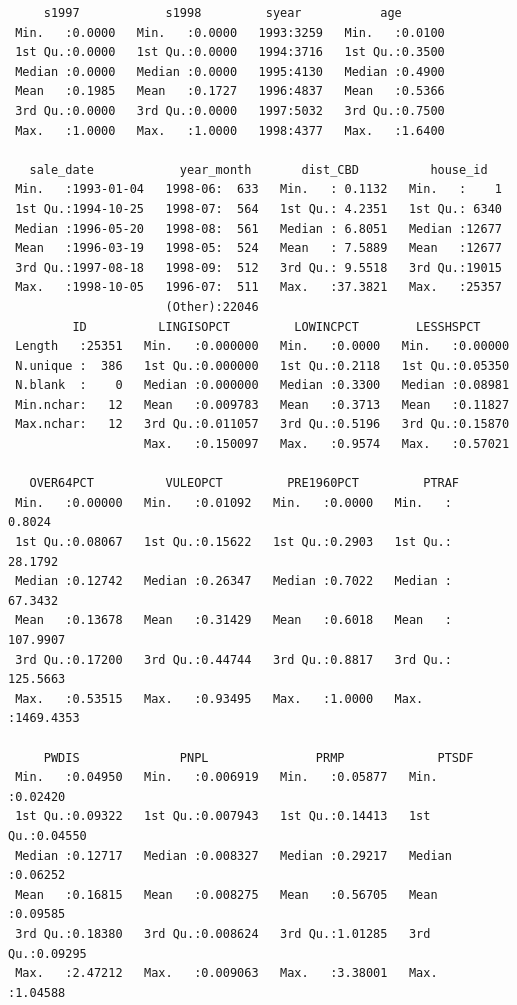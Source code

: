 \documentclass[
  norsk,
  a4paper,
]{article}
\begin{document}
\begin{verbatim}
     s1997            s1998         syear           age        
 Min.   :0.0000   Min.   :0.0000   1993:3259   Min.   :0.0100  
 1st Qu.:0.0000   1st Qu.:0.0000   1994:3716   1st Qu.:0.3500  
 Median :0.0000   Median :0.0000   1995:4130   Median :0.4900  
 Mean   :0.1985   Mean   :0.1727   1996:4837   Mean   :0.5366  
 3rd Qu.:0.0000   3rd Qu.:0.0000   1997:5032   3rd Qu.:0.7500  
 Max.   :1.0000   Max.   :1.0000   1998:4377   Max.   :1.6400  
                                                               
   sale_date            year_month       dist_CBD          house_id    
 Min.   :1993-01-04   1998-06:  633   Min.   : 0.1132   Min.   :    1  
 1st Qu.:1994-10-25   1998-07:  564   1st Qu.: 4.2351   1st Qu.: 6340  
 Median :1996-05-20   1998-08:  561   Median : 6.8051   Median :12677  
 Mean   :1996-03-19   1998-05:  524   Mean   : 7.5889   Mean   :12677  
 3rd Qu.:1997-08-18   1998-09:  512   3rd Qu.: 9.5518   3rd Qu.:19015  
 Max.   :1998-10-05   1996-07:  511   Max.   :37.3821   Max.   :25357  
                      (Other):22046                                    
         ID          LINGISOPCT         LOWINCPCT        LESSHSPCT      
 Length   :25351   Min.   :0.000000   Min.   :0.0000   Min.   :0.00000  
 N.unique :  386   1st Qu.:0.000000   1st Qu.:0.2118   1st Qu.:0.05350  
 N.blank  :    0   Median :0.000000   Median :0.3300   Median :0.08981  
 Min.nchar:   12   Mean   :0.009783   Mean   :0.3713   Mean   :0.11827  
 Max.nchar:   12   3rd Qu.:0.011057   3rd Qu.:0.5196   3rd Qu.:0.15870  
                   Max.   :0.150097   Max.   :0.9574   Max.   :0.57021  
                                                                        
   OVER64PCT          VULEOPCT         PRE1960PCT         PTRAF          
 Min.   :0.00000   Min.   :0.01092   Min.   :0.0000   Min.   :   0.8024  
 1st Qu.:0.08067   1st Qu.:0.15622   1st Qu.:0.2903   1st Qu.:  28.1792  
 Median :0.12742   Median :0.26347   Median :0.7022   Median :  67.3432  
 Mean   :0.13678   Mean   :0.31429   Mean   :0.6018   Mean   : 107.9907  
 3rd Qu.:0.17200   3rd Qu.:0.44744   3rd Qu.:0.8817   3rd Qu.: 125.5663  
 Max.   :0.53515   Max.   :0.93495   Max.   :1.0000   Max.   :1469.4353  
                                                                         
     PWDIS              PNPL               PRMP             PTSDF        
 Min.   :0.04950   Min.   :0.006919   Min.   :0.05877   Min.   :0.02420  
 1st Qu.:0.09322   1st Qu.:0.007943   1st Qu.:0.14413   1st Qu.:0.04550  
 Median :0.12717   Median :0.008327   Median :0.29217   Median :0.06252  
 Mean   :0.16815   Mean   :0.008275   Mean   :0.56705   Mean   :0.09585  
 3rd Qu.:0.18380   3rd Qu.:0.008624   3rd Qu.:1.01285   3rd Qu.:0.09295  
 Max.   :2.47212   Max.   :0.009063   Max.   :3.38001   Max.   :1.04588  
                                                                         

\end{verbatim}
\end{document}
